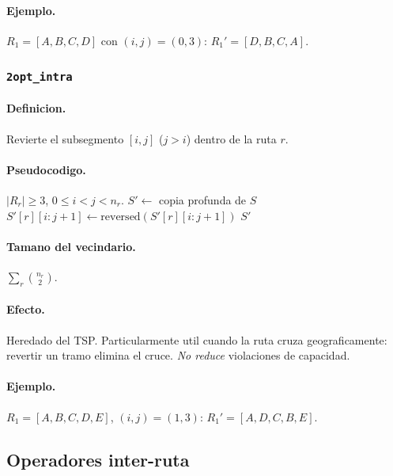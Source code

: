 \documentclass[11pt,a4paper]{article}
\newcommand{\op}[1]{\texttt{#1}}
\begin{document}
\paragraph{Ejemplo.} $R_1=[A,B,C,D]$ con $(i,j)=(0,3)$: $R_1'=[D,B,C,A]$.

\subsubsection{\op{2opt\_intra}}

\paragraph{Definicion.} Revierte el subsegmento $[i,j]$ ($j>i$) dentro
de la ruta $r$.

\paragraph{Pseudocodigo.}
\begin{algorithm}[H]
\caption{\op{2opt\_intra}($S, r, i, j$)}
\begin{algorithmic}[1]
\Require $|R_r|\ge 3$, $0\le i < j < n_r$.
\State $S' \gets$ copia profunda de $S$
\State $S'[r][i\!:\!j+1] \gets \text{reversed}(S'[r][i\!:\!j+1])$
\State \Return $S'$
\end{algorithmic}
\end{algorithm}

\paragraph{Tamano del vecindario.}
$\sum_r \binom{n_r}{2}$.

\paragraph{Efecto.} Heredado del TSP. Particularmente util cuando la
ruta cruza geograficamente: revertir un tramo elimina el cruce.
\emph{No reduce} violaciones de capacidad.

\paragraph{Ejemplo.} $R_1=[A,B,C,D,E]$, $(i,j)=(1,3)$:
$R_1'=[A,D,C,B,E]$.

\subsection{Operadores inter-ruta}
\end{document}
